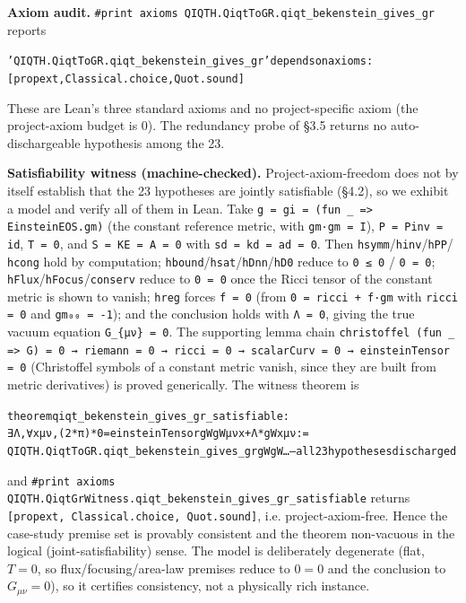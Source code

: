 \documentclass[11pt]{article}
\begin{document}
\textbf{Axiom audit.} \texttt{\#print axioms QIQTH.QiqtToGR.qiqt\_bekenstein\_gives\_gr} reports

{\footnotesize\begin{alltt}
'QIQTH.QiqtToGR.qiqt_bekenstein_gives_gr' depends on axioms: [propext, Classical.choice, Quot.sound]
\end{alltt}}

These are Lean's three standard axioms and no project-specific axiom (the project-axiom budget is 0). The
redundancy probe of §3.5 returns no auto-dischargeable hypothesis among the 23.

\textbf{Satisfiability witness (machine-checked).} Project-axiom-freedom does not by itself establish that
the 23 hypotheses are jointly satisfiable (§4.2), so we exhibit a model and verify all of them in
Lean. Take \texttt{g = gi = (fun \_ => EinsteinEOS.gm)} (the constant reference metric, with \texttt{gm·gm = I}),
\texttt{P = Pinv = id}, \texttt{T = 0}, and \texttt{S = KE = A = 0} with \texttt{sd = kd = ad = 0}. Then \texttt{hsymm}/\texttt{hinv}/\texttt{hPP}/
\texttt{hcong} hold by computation; \texttt{hbound}/\texttt{hsat}/\texttt{hDnn}/\texttt{hD0} reduce to \texttt{0 ≤ 0} / \texttt{0 = 0};
\texttt{hFlux}/\texttt{hFocus}/\texttt{conserv} reduce to \texttt{0 = 0} once the Ricci tensor of the constant metric is shown to
vanish; \texttt{hreg} forces \texttt{f = 0} (from \texttt{0 = ricci + f·gm} with \texttt{ricci = 0} and \texttt{gm₀₀ = -1}); and the
conclusion holds with \texttt{Λ = 0}, giving the true vacuum equation \texttt{G\_\{μν\} = 0}. The supporting lemma
chain \texttt{christoffel (fun \_ => G) = 0 → riemann = 0 → ricci = 0 → scalarCurv = 0 → einsteinTensor = 0}
(Christoffel symbols of a constant metric vanish, since they are built from metric derivatives) is
proved generically. The witness theorem is

{\footnotesize\begin{alltt}
theorem qiqt_bekenstein_gives_gr_satisfiable :
    ∃ Λ, ∀ x μ ν, (2*π) * 0 = einsteinTensor gW gW μ ν x + Λ * gW x μ ν :=
  QIQTH.QiqtToGR.qiqt_bekenstein_gives_gr gW gW … -- all 23 hypotheses discharged
\end{alltt}}

and \texttt{\#print axioms QIQTH.QiqtGrWitness.qiqt\_bekenstein\_gives\_gr\_satisfiable} returns
\texttt{[propext, Classical.choice, Quot.sound]}, i.e. project-axiom-free. Hence the case-study premise set is
provably consistent and the theorem non-vacuous in the logical (joint-satisfiability) sense. The
model is deliberately degenerate (flat, $T=0$, so flux/focusing/area-law premises reduce to $0=0$
and the conclusion to $G_{\mu\nu}=0$), so it certifies consistency, not a physically rich instance.
\end{document}

